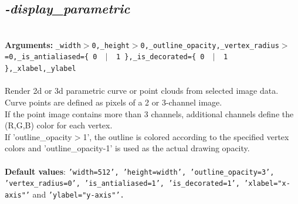 \documentclass[a4paper,11pt,twoside]{book}
\begin{document}
\subsection{\emph{-display\_parametric} }\vspace*{-0.5em}
~\\\textbf{Arguments: } 
{\small \texttt{\_width$>$0,\_height$>$0,\_outline\_opacity,\_vertex\_radius$>$=0,\_is\_antialiased=\{ 0 ~$|$~ 1 \},\_is\_decorated=\{ 0 ~$|$~ 1 \},\_xlabel,\_ylabel}}\\~\\
Render 2d or 3d parametric curve or point clouds from selected image data.
~\\Curve points are defined as pixels of a 2 or 3-channel image.
~\\If the point image contains more than 3 channels, additional channels define the (R,G,B) color for each vertex.
~\\If 'outline\_opacity$>$1', the outline is colored according to the specified vertex colors and 'outline\_opacity-1' is used as
the actual drawing opacity.
~\\~\\\textbf{Default values}: {\small \texttt{'width=512', 'height=width', 'outline\_opacity=3', 'vertex\_radius=0', 'is\_antialiased=1', 'is\_decorated=1', 'xlabel="x-axis"'} and \texttt{'ylabel="y-axis"'.}}
\end{document}
